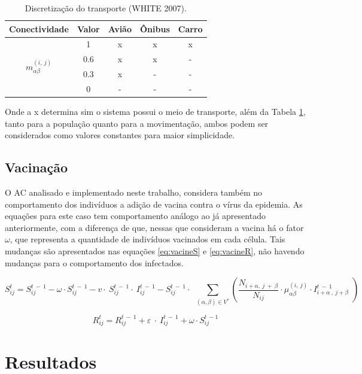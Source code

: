 \documentclass[a4paper,12pt]{article}
\begin{document}
\begin{table}[ht]
 \caption{Discretização do transporte (WHITE 2007\cite{White2007}).}
 \centering
 \begin{tabular}{c|c|c|c|c}
  Conectividade & Valor & Avião & Ônibus & Carro \\
  \hline
  \multirow{4}{*}{$m_{\alpha \beta}^{\left(i,\:j\right)}$} & 1 & x & x & x \\
   & 0.6 & x & x & - \\
   & 0.3 & x & - & - \\
   & 0 & - & - & - \\
\end{tabular}
\label{tab:movimentacao}
\end{table}

Onde a x determina sim o sistema possui o meio de transporte, além da Tabela \ref{tab:movimentacao}, tanto para a população quanto para a movimentação, ambos podem ser considerados como valores constantes para maior simplicidade.

\newpage
\subsection{Vacinação}
O AC analisado e implementado neste trabalho, considera também no comportamento dos indivíduos a adição de vacina contra o vírus da epidemia. As equações para este caso tem comportamento análogo ao já apresentado anteriormente, com a diferença de que, nessas que consideram a vacina há o fator $\omega$, que representa a quantidade de indivíduos vacinados em cada célula. Tais mudanças são apresentados nas equações \ref{eq:vacineS} e \ref{eq:vacineR}, não havendo mudanças para o comportamento dos infectados.

\begin{equation} 
S_{ij}^t=S_{ij}^{t\:-\:1}-\omega \cdot S_{ij}^{t\:-\:1}-v\cdot \:S_{ij}^{t\:-\:1}\cdot \:I_{ij}^{t\:-\:1}-S_{ij}^{t\:-\:1}\cdot \:\displaystyle \:\sum _{\left(\alpha ,\beta \right)\in V^{\ast }}^{ }\left(\frac{N_{i+\alpha ,\:j\:+\:\beta }}{N_{ij}}\cdot \mu _{\alpha \beta }^{\left(i,\:j\right)}\cdot I_{i+\alpha \:,\:j+\beta \:}^{t\:-\:1}\:\right)
\label{eq:vacineS}
\end{equation}

\begin{equation} 
R_{ij}^t=R_{ij}^{t\:-\:1}+\varepsilon \:\cdot \:I_{ij}^{t\:-\:1}+\omega \cdot S_{ij}^{t\:-1}
\label{eq:vacineR}
\end{equation}

\section{Resultados}
\end{document}
